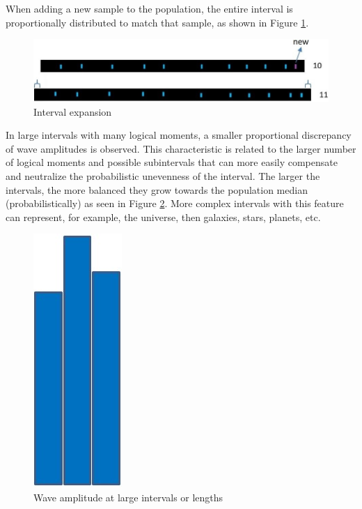 When adding a new sample to the population, the entire interval is proportionally distributed to match that sample, as shown in Figure \ref{fig:consciousness_space_volume_amplitude}.
	\begin{figure}[H]
	\caption{Interval expansion}
	\label{fig:consciousness_space_volume_amplitude}
	\centering
	\includegraphics[scale=.5]{sections/images/consciousness_space_volume_amplitude.jpg}
	\end{figure}
	
In large intervals with many logical moments, a smaller proportional discrepancy of wave amplitudes is observed. This characteristic is related to the larger number of logical moments and possible subintervals that can more easily compensate and neutralize the probabilistic unevenness of the interval. The larger the intervals, the more balanced they grow towards the population median (probabilistically) as seen in Figure \ref{fig:consciousness_space_subconsciousness}. More complex intervals with this feature can represent, for example, the universe, then galaxies, stars, planets, etc.
	\begin{figure}[H]
	\caption{Wave amplitude at large intervals or lengths}
	\label{fig:consciousness_space_subconsciousness}
	\centering
	\includegraphics[scale=.45]{sections/images/consciousness_space_subconsciousness.jpg}
	\end{figure}

